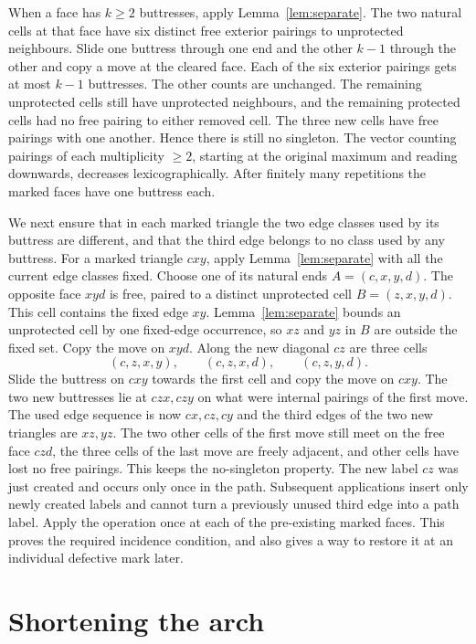 \documentclass[11pt]{amsart}
\begin{document}
When a face has \(k\ge 2\) buttresses, apply Lemma~\ref{lem:separate}.
The two natural cells at that face have six distinct free exterior
pairings to unprotected neighbours. Slide one buttress through one
end and the other \(k-1\) through the other and copy a move at the
cleared face. Each of the six exterior pairings gets at most \(k-1\)
buttresses. The other counts are unchanged. The remaining unprotected
cells still have unprotected neighbours, and the remaining protected
cells had no free pairing to either removed cell. The three new
cells have free pairings with one another. Hence there is still no
singleton. The vector counting pairings of each multiplicity
\(\ge 2\), starting at the original maximum and reading downwards,
decreases lexicographically. After finitely many repetitions the
marked faces have one buttress each.

We next ensure that in each marked triangle the two edge classes used
by its buttress are different, and that the third edge belongs to no
class used by any buttress. For a marked triangle \(cxy\), apply
Lemma~\ref{lem:separate} with all the current edge classes fixed. Choose
one of its natural ends \(A=(c,x,y,d)\). The opposite face \(xyd\)
is free, paired to a distinct unprotected cell \(B=(z,x,y,d)\). This
cell contains the fixed edge \(xy\). Lemma~\ref{lem:separate} bounds an
unprotected cell by one fixed-edge occurrence, so \(xz\) and \(yz\)
in \(B\) are outside the fixed set. Copy the move on \(xyd\). Along
the new diagonal \(cz\) are three cells
\[
               (c,z,x,y),\qquad (c,z,x,d),\qquad (c,z,y,d).
\]
Slide the buttress on \(cxy\) towards the first cell and copy the
move on \(cxy\). The two new buttresses lie at \(czx,czy\) on what were
internal pairings of the first move. The used edge sequence is now
\(cx,cz,cy\) and the third edges of the two new triangles are \(xz,yz\).
The two other cells of the first move still meet on the free face
\(czd\), the three cells of the last move are freely adjacent, and
other cells have lost no free pairings. This keeps the no-singleton
property. The new label \(cz\) was just created and occurs only once
in the path. Subsequent applications insert only newly created labels
and cannot turn a previously unused third edge into a path label.
Apply the operation once at each of the pre-existing marked faces.
This proves the required incidence condition, and also gives a way
to restore it at an individual defective mark later.

\section{Shortening the arch}\label{sec:shorten}
\end{document}
